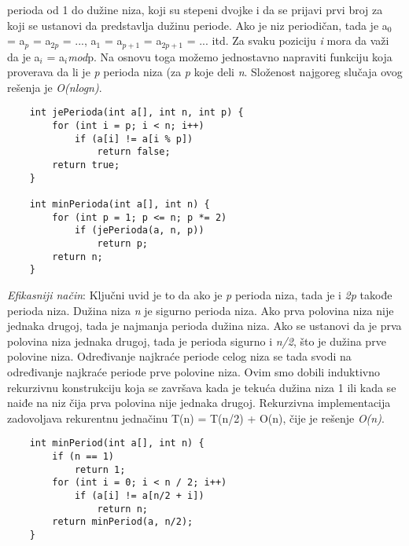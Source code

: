 \documentclass{article}
\begin{document}
perioda od 1 do dužine niza, koji su stepeni dvojke i da se prijavi prvi broj za
koji se ustanovi da predstavlja dužinu periode. Ako je niz periodičan, tada je
a$_0$ = a$_p$ = a$_{2p}$ = ..., a$_1$ = a$_{p+1}$ = a$_{2p+1}$ = ... itd. Za svaku poziciju \textit{i}
mora da važi da je a$_i$ = a$_i$\textit{mod}p. Na osnovu toga možemo jednostavno napraviti
funkciju koja proverava da li je \textit{p} perioda niza (za \textit{p} koje deli \textit{n}. Složenost
najgoreg slučaja ovog rešenja je \textit{O(nlogn)}.
\begin{lstlisting}
    int jePerioda(int a[], int n, int p) {
        for (int i = p; i < n; i++)
            if (a[i] != a[i % p])
                return false;
        return true;
    }
    
    int minPerioda(int a[], int n) {
        for (int p = 1; p <= n; p *= 2)
            if (jePerioda(a, n, p))
                return p;
        return n;
    }
\end{lstlisting}
\textit{Efikasniji način}: Ključni
uvid je to da ako je \textit{p} perioda niza, tada je i \textit{2p} takođe perioda niza. Dužina
niza \textit{n} je sigurno perioda niza. Ako prva polovina niza nije jednaka drugoj,
tada je najmanja perioda dužina niza. Ako se ustanovi da je prva polovina niza
jednaka drugoj, tada je perioda sigurno i \textit{n/2}, što je dužina prve polovine niza.
Određivanje najkraće periode celog niza se tada svodi na određivanje najkraće
periode prve polovine niza. Ovim smo dobili induktivno rekurzivnu konstrukciju
koja se završava kada je tekuća dužina niza 1 ili
kada se naiđe na niz čija prva polovina nije jednaka drugoj. Rekurzivna implementacija zadovoljava rekurentnu jednačinu T(n) = T(n/2) +
O(n), čije je rešenje \textit{O(n)}.
\begin{lstlisting}
    int minPeriod(int a[], int n) {
        if (n == 1)
            return 1;
        for (int i = 0; i < n / 2; i++)
            if (a[i] != a[n/2 + i])
                return n;
        return minPeriod(a, n/2);
    }
\end{lstlisting}
\end{document}
